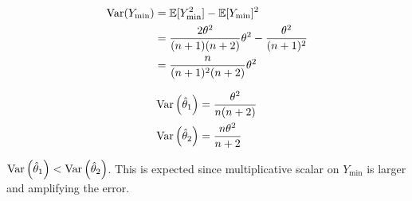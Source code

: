 \begin{align*}
  \text{Var}(Y_{\min}) &= \mathbb{E}\lbrack Y_{\min}^2\rbrack - \mathbb{E}\lbrack Y_{\min}\rbrack^{2} \\
                       &= \frac{2\theta^2}{(n+1)(n+2)}\theta^2 - \frac{\theta^2}{(n+1)^{2}} \\
                       &=  \frac{n}{(n+1)^{2}(n+2)}\theta^2
\end{align*}

\begin{align*}
  \text{Var}\left(\hat{\theta}_1\right) &= \frac{\theta^{2}}{n(n+2)}\\
  \text{Var}\left(\hat{\theta}_2\right) &= \frac{n\theta^{2}}{n+2}
\end{align*}

${\text{Var}\left(\hat{\theta}_1\right) < \text{Var}\left(\hat{\theta}_2\right)}$.  This is expected since multiplicative scalar on $Y_{\min}$ is larger and amplifying the error.
